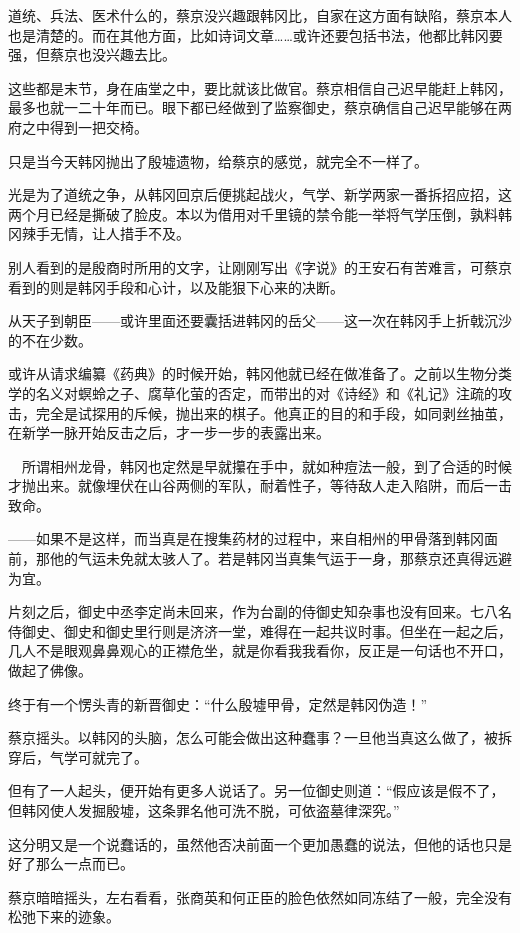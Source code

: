 道统、兵法、医术什么的，蔡京没兴趣跟韩冈比，自家在这方面有缺陷，蔡京本人也是清楚的。而在其他方面，比如诗词文章……或许还要包括书法，他都比韩冈要强，但蔡京也没兴趣去比。

这些都是末节，身在庙堂之中，要比就该比做官。蔡京相信自己迟早能赶上韩冈，最多也就一二十年而已。眼下都已经做到了监察御史，蔡京确信自己迟早能够在两府之中得到一把交椅。

只是当今天韩冈抛出了殷墟遗物，给蔡京的感觉，就完全不一样了。

光是为了道统之争，从韩冈回京后便挑起战火，气学、新学两家一番拆招应招，这两个月已经是撕破了脸皮。本以为借用对千里镜的禁令能一举将气学压倒，孰料韩冈辣手无情，让人措手不及。

别人看到的是殷商时所用的文字，让刚刚写出《字说》的王安石有苦难言，可蔡京看到的则是韩冈手段和心计，以及能狠下心来的决断。

从天子到朝臣——或许里面还要囊括进韩冈的岳父——这一次在韩冈手上折戟沉沙的不在少数。

或许从请求编纂《药典》的时候开始，韩冈他就已经在做准备了。之前以生物分类学的名义对螟蛉之子、腐草化萤的否定，而带出的对《诗经》和《礼记》注疏的攻击，完全是试探用的斥候，抛出来的棋子。他真正的目的和手段，如同剥丝抽茧，在新学一脉开始反击之后，才一步一步的表露出来。

　所谓相州龙骨，韩冈也定然是早就攥在手中，就如种痘法一般，到了合适的时候才抛出来。就像埋伏在山谷两侧的军队，耐着性子，等待敌人走入陷阱，而后一击致命。

——如果不是这样，而当真是在搜集药材的过程中，来自相州的甲骨落到韩冈面前，那他的气运未免就太骇人了。若是韩冈当真集气运于一身，那蔡京还真得远避为宜。

片刻之后，御史中丞李定尚未回来，作为台副的侍御史知杂事也没有回来。七八名侍御史、御史和御史里行则是济济一堂，难得在一起共议时事。但坐在一起之后，几人不是眼观鼻鼻观心的正襟危坐，就是你看我我看你，反正是一句话也不开口，做起了佛像。

终于有一个愣头青的新晋御史：“什么殷墟甲骨，定然是韩冈伪造！”

蔡京摇头。以韩冈的头脑，怎么可能会做出这种蠢事？一旦他当真这么做了，被拆穿后，气学可就完了。

但有了一人起头，便开始有更多人说话了。另一位御史则道：“假应该是假不了，但韩冈使人发掘殷墟，这条罪名他可洗不脱，可依盗墓律深究。”

这分明又是一个说蠢话的，虽然他否决前面一个更加愚蠢的说法，但他的话也只是好了那么一点而已。

蔡京暗暗摇头，左右看看，张商英和何正臣的脸色依然如同冻结了一般，完全没有松弛下来的迹象。

